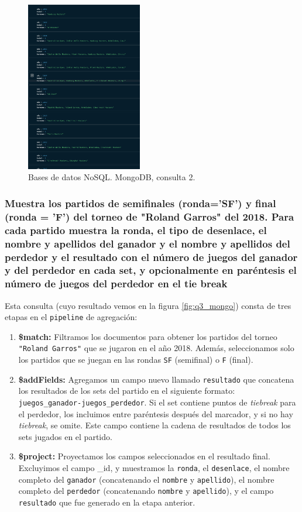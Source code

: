 \begin{figure}[H]
\centering
\includegraphics[width=0.45\textwidth]{fotos/mongo/q2.png}
\caption{Bases de datos NoSQL. MongoDB, consulta 2.}
\label{fig:q2_mongo}
\end{figure}


\subsubsection{Muestra los partidos de semiﬁnales (ronda='SF') y ﬁnal (ronda = 'F') del torneo de "Roland Garros" del 2018. Para cada partido muestra la ronda, el tipo de desenlace, el nombre y apellidos del ganador y el nombre y apellidos del perdedor y el resultado con el número de juegos del ganador y del perdedor en cada set, y opcionalmente en paréntesis el número de juegos del perdedor en el tie break}

Esta consulta (cuyo resultado vemos en la figura \ref{fig:q3_mongo}) consta de tres etapas en el \texttt{pipeline} de agregación:

\begin{enumerate}
    \item \textbf{\$match:} Filtramos los documentos para obtener los partidos del torneo \texttt{"Roland Garros"} que se jugaron en el año 2018. Además, seleccionamos solo los partidos que se juegan en las rondas \texttt{SF} (semifinal) o \texttt{F} (final).
    \item \textbf{\$addFields:} Agregamos un campo nuevo llamado \texttt{resultado} que concatena los resultados de los sets del partido en el siguiente formato: \texttt{juegos\_ganador-juegos\_perdedor}. Si el set contiene puntos de \textit{tiebreak} para el perdedor, los incluimos entre paréntesis después del marcador, y si no hay \textit{tiebreak}, se omite. Este campo contiene la cadena de resultados de todos los sets jugados en el partido.
    \item \textbf{\$project:} Proyectamos los campos seleccionados en el resultado final. Excluyimos el campo \_id, y muestramos la \texttt{ronda}, el \texttt{desenlace}, el nombre completo del \texttt{ganador} (concatenando el \texttt{nombre} y \texttt{apellido}), el nombre completo del \texttt{perdedor} (concatenando \texttt{nombre} y \texttt{apellido}), y el campo \texttt{resultado} que fue generado en la etapa anterior.
\end{enumerate}

